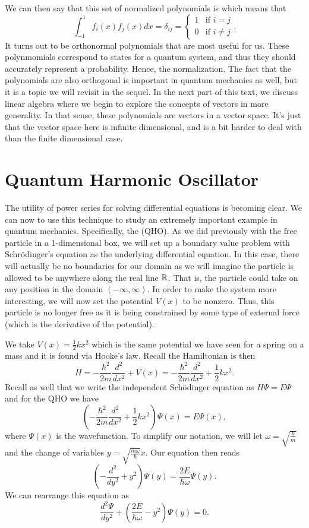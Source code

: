 We can then say that this set of normalized polynomials is  which means that
\[
\int_{-1}^1 f_i(x)f_j(x)dx = \delta_{ij} = \begin{cases} 1 & \textrm{if $i=j$}\\ 0 & \textrm{if $i\neq j$}\end{cases}.
\]
It turns out to be orthonormal polynomials that are most useful for us.  These polynmomials correspond to states for a quantum system, and thus they should accurately represent a probability. Hence, the normalization.  The fact that the polynomials are also orthogonal is important in quantum mechanics as well, but it is a topic we will revisit in the sequel. In the next part of this text, we discuss linear algebra where we begin to explore the concepts of vectors in more generality.  In that sense, these polynomials are vectors in a vector space.  It's just that the vector space here is infinite dimensional, and is a bit harder to deal with than the finite dimensional case.

\section{Quantum Harmonic Oscillator}

The utility of power series for solving differential equations is becoming clear. We can now to use this technique to study an extremely important example in quantum mechanics.  Specifically, the   (QHO).  As we did previously with the free particle in a 1-dimensional box, we will set up a boundary value problem with Schr\"odinger's equation as the underlying differential equation.  In this case, there will actually be no boundaries for our domain as we will imagine the particle is allowed to be anywhere along the real line $\mathbb{R}$.  That is, the particle could take on any position in the domain $(-\infty,\infty)$.  In order to make the system more interesting, we will now set the potential $V(x)$ to be nonzero.  Thus, this particle is no longer free as it is being constrained by some type of external force (which is the derivative of the potential).  

We take $V(x)=\frac{1}{2}kx^2$ which is the same potential we have seen for a spring on a mass and it is found via Hooke's law.  Recall the Hamiltonian is then
\[
H = -\frac{\hbar^2}{2m} \frac{d^2}{dx^2} + V(x) = -\frac{\hbar^2}{2m} \frac{d^2}{dx^2} + \frac{1}{2}kx^2.
\]
Recall as well that we write the independent Sch\"odinger equation as $H\Psi = E\Psi$ and for the QHO we have
\begin{equation}
\label{eq:qho}
\left(-\frac{\hbar^2}{2m} \frac{d^2}{dx^2} + \frac{1}{2}kx^2\right)\Psi(x) = E \Psi(x),
\end{equation}
where $\Psi(x)$ is the wavefunction. To simplify our notation, we will let $\omega = \sqrt{\frac{k}{m}}$ and the change of variables $y=\sqrt{\frac{m \omega}{\hbar}}x$.  Our equation then reads
\[
\left(-\frac{d^2}{dy^2} + y^2\right) \Psi(y) = \frac{2E}{\hbar \omega}\Psi(y).
\]
We can rearrange this equation as
\[
\frac{d^2 \Psi}{dy^2} + \left(\frac{2E}{\hbar \omega} - y^2\right)\Psi(y)=0.
\]


